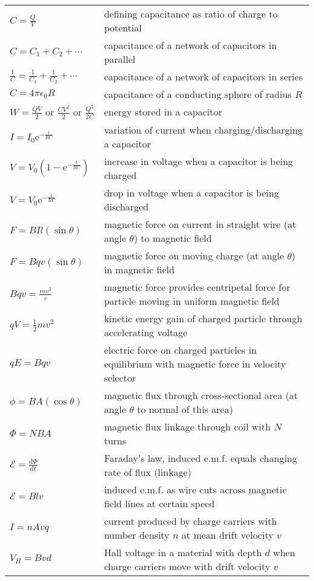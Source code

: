 {{\begin{longtable}{p{} p{}}
	$C=\frac{Q}{V}$ & defining capacitance as ratio of charge to potential \\
	$C=C_1+C_2+\cdots$ & capacitance of a network of capacitors in parallel \\
	$\frac{1}{C}=\frac{1}{C_1}+\frac{1}{C_2}+\cdots$ & capacitance of a network of capacitors in series \\
	$C=4\pi\epsilon_0R$ & capacitance of a conducting sphere of radius $R$ \\
	$W=\frac{QV}{2} \text{ or } \frac{CV^2}{2}  \text{ or }  \frac{Q^2}{2C}$ & energy stored in a capacitor \\
	$I=I_0 \mathrm{e}^{-\frac{t}{RC}}$ & variation of current when charging/discharging a capacitor \\
	$V = V_0 \left( 1- \mathrm{e}^{-\frac{t}{RC}}\right)$ & increase in voltage when a capacitor is being charged \\
	$V = V_0 \mathrm{e}^{-\frac{t}{RC}}$ & drop in voltage when a capacitor is being discharged \\
	$F=BIl(\sin\theta)$ & magnetic force on current in straight wire (at angle $\theta$) to magnetic field \\
	$F=Bqv(\sin\theta)$ & magnetic force on moving charge (at angle $\theta$) in magnetic field \\
	$Bqv=\frac{mv^2}{r}$ & magnetic force provides centripetal force for particle moving in uniform magnetic field \\
	$qV=\frac{1}{2}mv^2$ & kinetic energy gain of charged particle through accelerating voltage \\
	$qE = Bqv$ & electric force on charged particles in equilibrium with magnetic force in velocity selector \\
	$\phi=BA(\cos\theta)$ & magnetic flux through cross-sectional area (at angle $\theta$ to normal of this area)\\
	$\Phi=NBA$ & magnetic flux linkage through coil with $N$ turns\\
	$\mathcal{E}=\frac{\mathrm{d}\Phi}{\mathrm{d}t}$ & Faraday's law, induced e.m.f. equals changing rate of flux (linkage) \\
	$\mathcal{E}=Blv$ & induced e.m.f. as wire cuts across magnetic field lines at certain speed \\
	$I=nAvq$ & current produced by charge carriers with number density $n$ at mean drift velocity $v$\\
	$V_H = Bvd$ & Hall voltage in a material with depth $d$ when charge carriers move with drift velocity $v$ \\

\end{longtable}}}
